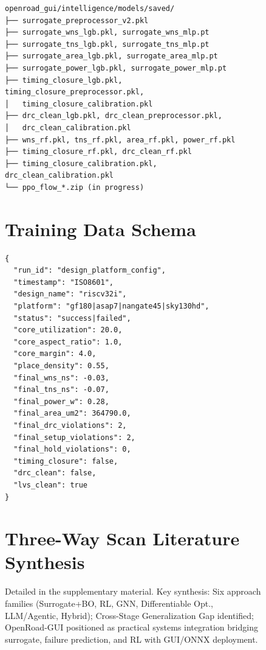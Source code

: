 \documentclass[10pt,conference]{IEEEtran}
\begin{document}
\begin{figure}[t]
\begin{verbatim}
openroad_gui/intelligence/models/saved/
├── surrogate_preprocessor_v2.pkl
├── surrogate_wns_lgb.pkl, surrogate_wns_mlp.pt
├── surrogate_tns_lgb.pkl, surrogate_tns_mlp.pt
├── surrogate_area_lgb.pkl, surrogate_area_mlp.pt
├── surrogate_power_lgb.pkl, surrogate_power_mlp.pt
├── timing_closure_lgb.pkl, timing_closure_preprocessor.pkl,
│   timing_closure_calibration.pkl
├── drc_clean_lgb.pkl, drc_clean_preprocessor.pkl,
│   drc_clean_calibration.pkl
├── wns_rf.pkl, tns_rf.pkl, area_rf.pkl, power_rf.pkl
├── timing_closure_rf.pkl, drc_clean_rf.pkl
├── timing_closure_calibration.pkl, drc_clean_calibration.pkl
└── ppo_flow_*.zip (in progress)
\end{verbatim}

\section{Training Data Schema}
\label{app:data_schema}

\begin{verbatim}
{
  "run_id": "design_platform_config",
  "timestamp": "ISO8601",
  "design_name": "riscv32i",
  "platform": "gf180|asap7|nangate45|sky130hd",
  "status": "success|failed",
  "core_utilization": 20.0,
  "core_aspect_ratio": 1.0,
  "core_margin": 4.0,
  "place_density": 0.55,
  "final_wns_ns": -0.03,
  "final_tns_ns": -0.07,
  "final_power_w": 0.28,
  "final_area_um2": 364790.0,
  "final_drc_violations": 2,
  "final_setup_violations": 2,
  "final_hold_violations": 0,
  "timing_closure": false,
  "drc_clean": false,
  "lvs_clean": true
}
\end{verbatim}

\section{Three-Way Scan Literature Synthesis}
\label{app:three_way_scan}

Detailed in the supplementary material. Key synthesis: Six approach families (Surrogate+BO, RL, GNN, Differentiable Opt., LLM/Agentic, Hybrid); Cross-Stage Generalization Gap identified; OpenRoad-GUI positioned as practical systems integration bridging surrogate, failure prediction, and RL with GUI/ONNX deployment.



\end{figure}
\end{document}
